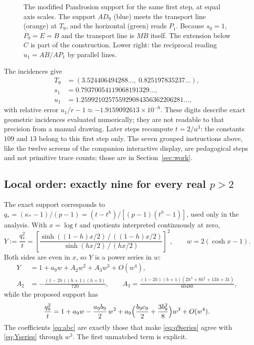 \begin{figure}[h]
\centering\figSupport
\caption{The modified Pandrosion support for the same first step, at equal axis scales. The support
$AD_9$ (blue) meets the transport line (orange) at $T_9$, and the horizontal (green) reads $P_1$. Because
$s_0=1$, $P_0=E=B$ and the transport line is $MB$ itself. The extension below $C$ is part of the
construction. Lower right: the reciprocal reading $u_1=AB/AP_1$ by parallel lines.}\label{fig:support}
\end{figure}

The incidences give
\begin{align*}
T_9&=(3.524406494288\ldots,\;0.825197835237\ldots),\\
s_1&=0.79370054119068191329\ldots,\\
u_1&=1.259921025755929084356362206281\ldots,
\end{align*}
with relative error $u_1/r-1\approx-1.9159092613\times10^{-8}$. These digits describe exact geometric
incidences evaluated numerically; they are not readable to that precision from a manual drawing. Later
steps recompute $t=2/u^{3}$: the constants $109$ and $13$ belong to this first step only. The seven
grouped instructions above, like the twelve screens of the companion interactive display, are
pedagogical steps and not primitive trace counts; those are in Section~\ref{sec:work}.

\subsection{Local order: exactly nine for every real \texorpdfstring{$p>2$}{p > 2}}

The exact support corresponds to $q_*=(\kappa_*-1)/(p-1)=(t-t^{h})/[(p-1)(t^{h}-1)]$, used only in the
analysis. With $x=\log t$ and quotients interpreted continuously at zero,
\[ Y:=\frac{q_*^{2}}{t}=\left[\frac{\sinh((1-h)x/2)\,/\,((1-h)x/2)}{\sinh(hx/2)\,/\,(hx/2)}\right]^{2},
\qquad w=2(\cosh x-1). \]
Both sides are even in $x$, so $Y$ is a power series in $w$:
\begin{equation}\label{eq:Yseries}
\begin{aligned}
Y&=1+a_9w+A_2w^{2}+A_3w^{3}+O(w^{4}),\\
A_2&=-\frac{(1-2h)(h+1)(h+3)}{720},\qquad
A_3=\frac{(1-2h)(h+1)(2h^{3}+8h^{2}+13h+31)}{60480},
\end{aligned}
\end{equation}
while the proposed support has
\begin{equation}\label{eq:q9series}
\frac{q_9^{2}}{t}=1+a_9w-\frac{a_9b_9}{2}\,w^{2}+a_9\Bigl(\frac{b_9c_9}{2}+\frac{3b_9^{2}}{8}\Bigr)w^{3}+O(w^{4}).
\end{equation}
The coefficients \eqref{eq:abc} are exactly those that make \eqref{eq:q9series} agree with
\eqref{eq:Yseries} through $w^{3}$. The first unmatched term is explicit.

